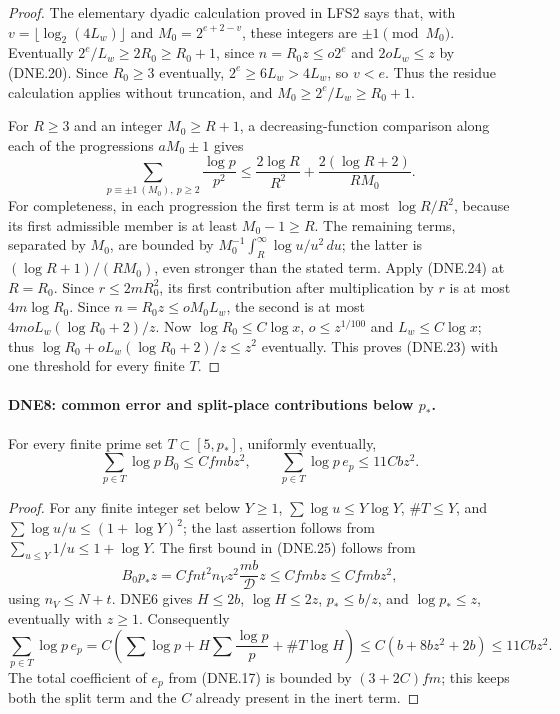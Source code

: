 \begin{proof}
The elementary dyadic calculation proved in LFS2 says that, with
$v=\lfloor\log_2(4L_w)\rfloor$ and
$M_0=2^{e+2-v}$, these integers are $\pm1\pmod{M_0}$.
Eventually $2^e/L_w\ge2R_0\ge R_0+1$, since
$n=R_0z\le o2^e$ and $2oL_w\le z$ by (DNE.20).
Since $R_0\ge3$ eventually, $2^e\ge6L_w>4L_w$,
so $v<e$.  Thus the residue calculation applies without truncation, and
$M_0\ge2^e/L_w\ge R_0+1$.

For $R\ge3$ and an integer $M_0\ge R+1$, a decreasing-function
comparison along each of the progressions $aM_0\pm1$ gives
\[
 \sum_{p\equiv\pm1\ (M_0),\ p\ge2}\frac{\log p}{p^2}
 \le\frac{2\log R}{R^2}
             +\frac{2(\log R+2)}{RM_0}.                 \tag{DNE.24}
\]
For completeness, in each progression the first term is at most
$\log R/R^2$, because its first admissible member is at least
$M_0-1\ge R$.  The remaining terms, separated by $M_0$, are
bounded by $M_0^{-1}\int_R^\infty\log u/u^2\,du$; the latter
is $(\log R+1)/(RM_0)$, even stronger than the stated term.
Apply (DNE.24) at $R=R_0$.  Since $r\le2mR_0^2$, its first
contribution after multiplication by $r$ is at most $4m\log R_0$.
Since $n=R_0z\le oM_0L_w$, the second is at most
$4moL_w(\log R_0+2)/z$.
Now $\log R_0\le C\log x$, $o\le z^{1/100}$ and
$L_w\le C\log x$; thus
$\log R_0+oL_w(\log R_0+2)/z\le z^2$ eventually.
This proves (DNE.23) with one threshold for every finite $T$.
\end{proof}

\paragraph{DNE8: common error and split-place contributions below $p_*$.}
\label{claim:DNE8}
For every finite prime set $T\subset[5,p_*]$, uniformly eventually,
\[
 \sum_{p\in T}\log p\,B_0\le Cfm bz^2,
 \qquad \sum_{p\in T}\log p\,e_p\le11Cbz^2.             \tag{DNE.25}
\]

\begin{proof}
For any finite integer set below $Y\ge1$,
$\sum\log u\le Y\log Y$, $\#T\le Y$, and
$\sum\log u/u\le(1+\log Y)^2$; the last assertion follows from
$\sum_{u\le Y}1/u\le1+\log Y$.
The first bound in (DNE.25) follows from
\[
 B_0p_*z=Cfnt^2n_Vz^2\frac{mb}{\mathcal D}z
      \le Cfm bz\le Cfm bz^2,
\]
using $n_V\le N+t$.  DNE6 gives $H\le2b$, $\log H\le2z$,
$p_*\le b/z$, and $\log p_*\le z$, eventually with $z\ge1$.
Consequently
\[
 \sum_{p\in T}\log p\,e_p
 =C\left(\sum\log p+H\sum\frac{\log p}{p}
                                     +\#T\log H\right)
 \le C(b+8bz^2+2b)\le11Cbz^2.
\]
The total coefficient of $e_p$ from (DNE.17) is bounded by
$(3+2C)fm$; this keeps both the split term and the $C$ already
present in the inert term.
\end{proof}

